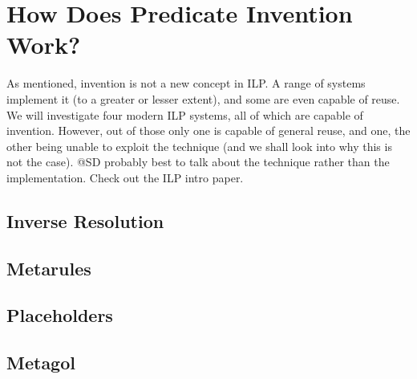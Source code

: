 \section{How Does Predicate Invention Work?}
As mentioned, invention is not a new concept in ILP. A range of systems implement it (to a greater or lesser extent), and some are even capable of reuse. We will investigate four modern ILP systems, all of which are capable of invention. However, out of those only one is capable of general reuse, and one, the other being unable to exploit the technique (and we shall look into why this is not the case).
\ac{@SD probably best to talk about the technique rather than the implementation. Check out the ILP intro paper.}

\subsection{Inverse Resolution}

\subsection{Metarules}

\subsection{Placeholders}


\subsection{Metagol}

